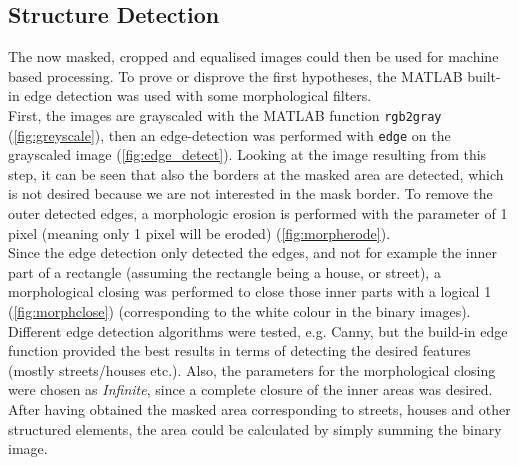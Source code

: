 \subsection{Structure Detection}
The now masked, cropped and equalised images could then be used for machine based processing. To prove or disprove the first hypotheses, the MATLAB built-in edge detection was used with some morphological filters. \\
First, the images are grayscaled with the MATLAB function \texttt{rgb2gray} (\cref{fig:greyscale}), then an edge-detection was performed with \texttt{edge} on the grayscaled image (\cref{fig:edge_detect}). Looking at the image resulting from this step, it can be seen that also the borders at the masked area are detected, which is not desired because we are not interested in the mask border. To remove the outer detected edges, a morphologic erosion is performed with the parameter of 1 pixel (meaning only 1 pixel will be eroded) (\cref{fig:morpherode}). \\
Since the edge detection only detected the edges, and not for example the inner part of a rectangle (assuming the rectangle being a house, or street), a morphological closing was performed to close those inner parts with a logical 1 (\cref{fig:morphclose}) (corresponding to the white colour in the binary images). Different edge detection algorithms were tested, e.g. Canny, but the build-in edge function provided the best results in terms of detecting the desired features (mostly streets/houses etc.). Also, the parameters for the morphological closing were chosen as \textit{Infinite}, since a complete closure of the inner areas was desired.\\
After having obtained the masked area corresponding to streets, houses and other structured elements, the area could be calculated by simply summing the binary image.


